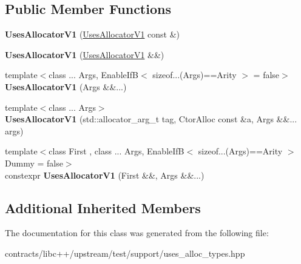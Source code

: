 \subsection*{Public Member Functions}
\begin{DoxyCompactItemize}
\item 
\mbox{\label{class_uses_allocator_v1_a39f33150204e36a97aac37ae44d9b290}} 
{\bfseries Uses\+Allocator\+V1} (\mbox{\hyperlink{class_uses_allocator_v1}{Uses\+Allocator\+V1}} const \&)
\item 
\mbox{\label{class_uses_allocator_v1_a0be327f9d968b9532e2acf0a9b2a0d59}} 
{\bfseries Uses\+Allocator\+V1} (\mbox{\hyperlink{class_uses_allocator_v1}{Uses\+Allocator\+V1}} \&\&)
\item 
\mbox{\label{class_uses_allocator_v1_ae6c3e24d0e5e3da8309e08bfa5dd2cb2}} 
{\footnotesize template$<$class ... Args, Enable\+If\+B$<$ sizeof...(\+Args)==\+Arity $>$  = false$>$ }\\{\bfseries Uses\+Allocator\+V1} (Args \&\&...)
\item 
\mbox{\label{class_uses_allocator_v1_a1c592d718fea01b4ee470cf06a44e321}} 
{\footnotesize template$<$class ... Args$>$ }\\{\bfseries Uses\+Allocator\+V1} (std\+::allocator\+\_\+arg\+\_\+t tag, Ctor\+Alloc const \&a, Args \&\&... args)
\item 
\mbox{\label{class_uses_allocator_v1_a70d8e80cbfe25453a51d27d251dd13a5}} 
{\footnotesize template$<$class First , class ... Args, Enable\+If\+B$<$ sizeof...(\+Args)==\+Arity $>$ Dummy = false$>$ }\\constexpr {\bfseries Uses\+Allocator\+V1} (First \&\&, Args \&\&...)
\end{DoxyCompactItemize}
\subsection*{Additional Inherited Members}


The documentation for this class was generated from the following file\+:\begin{DoxyCompactItemize}
\item 
contracts/libc++/upstream/test/support/uses\+\_\+alloc\+\_\+types.\+hpp\end{DoxyCompactItemize}
